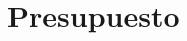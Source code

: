 \documentclass[12pt,a4paper]{article}
\newcommand{\newsection}[1]{\section{\hspace{6mm} #1}}%
\begin{document}
\newpage
\newsection{Presupuesto}
\lipsum[1]
    
\end{document}

